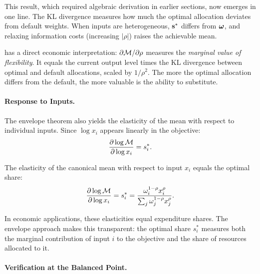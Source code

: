 This result, which required algebraic derivation in earlier sections, now emerges in one line. The KL divergence measures how much the optimal allocation deviates from default weights. When inputs are heterogeneous, $\mathbf{s}^*$ differs from $\boldsymbol{\omega}$, and relaxing information costs (increasing $|\rho|$) raises the achievable mean.

\begin{calloutnote}
 has a direct economic interpretation: $\partial \mathcal{M} / \partial \rho$ measures the \emph{marginal value of flexibility}. It equals the current output level times the KL divergence between optimal and default allocations, scaled by $1/\rho^2$. The more the optimal allocation differs from the default, the more valuable is the ability to substitute.
\end{calloutnote}

\paragraph{Response to Inputs.}

The envelope theorem also yields the elasticity of the mean with respect to individual inputs. Since $\log x_i$ appears linearly in the objective:
\begin{equation}
\frac{\partial \log \mathcal{M}}{\partial \log x_i} = s_i^*.
\end{equation}

\begin{proposition}
\label{prop:envelope-inputs}
The elasticity of the canonical mean with respect to input $x_i$ equals the optimal share:
\begin{equation}
\label{eq:input-elasticity}
\frac{\partial \log \mathcal{M}}{\partial \log x_i} = s_i^* = \frac{\omega_i^{1-\rho} x_i^\rho}{\sum_j \omega_j^{1-\rho} x_j^\rho}.
\end{equation}
\end{proposition}

In economic applications, these elasticities equal expenditure shares. The envelope approach makes this transparent: the optimal share $s_i^*$ measures both the marginal contribution of input $i$ to the objective and the share of resources allocated to it.

\paragraph{Verification at the Balanced Point.}

